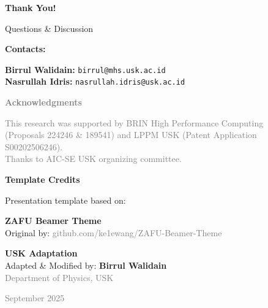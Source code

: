 \documentclass{beamer}
\begin{document}
\begin{frame}{}
  \vfill
  \begin{center}
    {\Huge \textcolor{uskGold}{\textbf{Thank You!}}}
    
    \vspace{1em}
    
    {\Large Questions \& Discussion}
    
    \vspace{1.5em}
    
    {\large \textcolor{uskGold}{\textbf{Contacts:}}}
    
    \vspace{0.5em}
    
    {\normalsize 
    \textbf{Birrul Walidain:} \texttt{birrul@mhs.usk.ac.id}\\
    \textbf{Nasrullah Idris:} \texttt{nasrullah.idris@usk.ac.id}
    }
  \end{center}
  \vfill
  
  \begin{center}
    {\footnotesize \textcolor{gray}{\textbf{Acknowledgments}}}
    
    \vspace{0.3em}
    
    {\scriptsize \textcolor{gray}{
    This research was supported by BRIN High Performance Computing\\
    (Proposals 224246 \& 189541) and LPPM USK (Patent Application S00202506246).\\
    Thanks to AIC-SE USK organizing committee.
    }}
  \end{center}
\end{frame}

\begin{frame}{}
  \vfill
  \begin{center}
    {\Large \textcolor{uskGold}{\textbf{Template Credits}}}
    
    \vspace{1.5em}
    
    {\large Presentation template based on:}
    
    \vspace{1em}
    
    {\LARGE \textbf{ZAFU Beamer Theme}}\\
    \vspace{0.5em}
    {\normalsize Original by: \textcolor{gray}{github.com/ke1ewang/ZAFU-Beamer-Theme}}
    
    \vspace{1.5em}
    
    {\large \textcolor{uskGold}{\textbf{USK Adaptation}}}\\
    \vspace{0.5em}
    {\normalsize Adapted \& Modified by: \textbf{Birrul Walidain}}\\
    {\small \textcolor{gray}{Department of Physics, USK}}
    
    \vspace{1em}
    
    {\small \textcolor{gray}{September 2025}}
  \end{center}
  \vfill
\end{frame}
\end{document}
